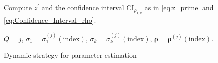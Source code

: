 \begin{algorithm}[!ht]
{{    Compute $z^\prime$ and the confidence interval $\text{CI}_{\rho_{1,k}}$ as in \eqref{eq:z_prime} and \eqref{eq:Confidence_Interval_rho}.
    

    
    {
    }
    }
    
    
    }    
    
    $Q=j$, $\sigma_1 = \sigma_1^{(j)}(\text{index})$, $\sigma_k = \sigma_k^{(j)}(\text{index})$, $\boldsymbol{\rho} = \boldsymbol{\rho}^{(j)}(\text{index})$.
\caption{Dynamic strategy for parameter estimation}\label{algo:Parameter_Estimation}
\end{algorithm}







%
